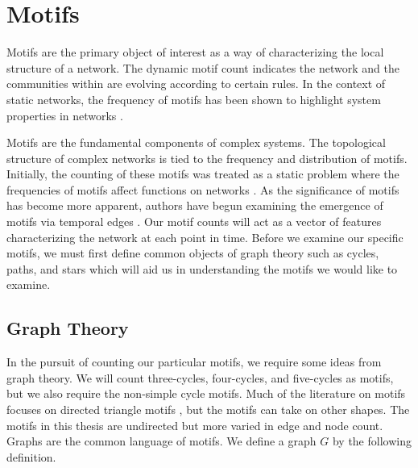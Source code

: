 %

\chapter{Motifs}
\label{section:Motifs}

Motifs are the primary object of interest as a way of characterizing the local structure of a
network. The dynamic motif count indicates the network and the communities within are evolving according to certain rules.
In the context of static networks, the frequency of motifs 
has been shown to highlight system properties in networks \cite{bioAlbert} \cite{biomotif}.

Motifs are the fundamental components of complex systems.
The topological structure of complex networks
is tied to the frequency and distribution of motifs. Initially, the counting of 
these motifs was treated as a static problem where the frequencies of motifs affect functions on networks \cite{motifdiscovery}.
As the significance of motifs has become more apparent, authors have begun examining the emergence of motifs 
via temporal edges \cite{temporalmotifs}. Our motif counts will
act as a vector of features characterizing the network at each point in time. Before we
examine our specific motifs, we must first define common objects of graph theory such as cycles, paths, and stars
which will aid us in understanding the motifs we would like to examine.

\section{Graph Theory}

In the pursuit of counting our particular motifs, we require some
ideas from graph theory. We will count three-cycles, four-cycles, and five-cycles
as motifs, but we also require the non-simple cycle motifs.
Much of the literature on motifs focuses on directed triangle motifs  \cite{Milo824} \cite{temporalmotifs} \cite{Interactome}, but 
 the motifs can take on other shapes. The motifs in this thesis are undirected but more varied in edge and node count.
 Graphs are the common language of motifs. We define a graph $G$ by the following definition.

